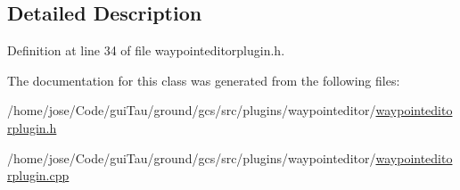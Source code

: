 \subsection{Detailed Description}


Definition at line 34 of file waypointeditorplugin.\-h.



The documentation for this class was generated from the following files\-:\begin{DoxyCompactItemize}
\item 
/home/jose/\-Code/gui\-Tau/ground/gcs/src/plugins/waypointeditor/\hyperlink{waypointeditorplugin_8h}{waypointeditorplugin.\-h}\item 
/home/jose/\-Code/gui\-Tau/ground/gcs/src/plugins/waypointeditor/\hyperlink{waypointeditorplugin_8cpp}{waypointeditorplugin.\-cpp}\end{DoxyCompactItemize}
